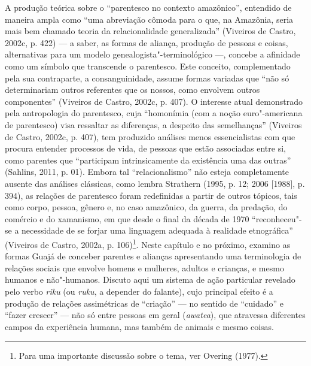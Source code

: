 A produção teórica sobre o ``parentesco no contexto amazônico'', entendido
de maneira ampla como ``uma abreviação cômoda para o que, na Amazônia,
seria mais bem chamado teoria da relacionalidade generalizada'' (Viveiros
de Castro, 2002c, p. 422) --- a saber, as formas de aliança, produção de
pessoas e coisas, alternativas para um modelo genealogista"-terminológico
---, concebe a afinidade como um símbolo que transcende o parentesco. Este
conceito, complementado pela sua contraparte, a consanguinidade, assume
formas variadas que ``não só determinariam outros referentes que os
nossos, como envolvem outros componentes'' (Viveiros de Castro,
2002c, p. 407). O interesse atual demonstrado pela antropologia do
parentesco, cuja ``homonímia (com a noção euro"-americana de parentesco)
visa ressaltar as diferenças, a despeito das semelhanças'' (Viveiros de
Castro, 2002c, p. 407), tem produzido análises menos essencialistas com que
procura entender processos de vida, de pessoas que estão associadas
entre si, como parentes que ``participam intrinsicamente da existência
uma das outras'' (Sahlins, 2011, p. 01). Embora tal ``relacionalismo'' não
esteja completamente ausente das análises clássicas, como lembra
Strathern (1995, p. 12; 2006 {[}1988{]}, p. 394), as relações de parentesco
foram redefinidas a partir de outros tópicos, tais como corpo, pessoa,
gênero e, no caso amazônico, da guerra, da predação, do comércio e do
xamanismo, em que desde o final da década de 1970 ``reconheceu"-se a
necessidade de se forjar uma linguagem adequada à realidade etnográfica''
(Viveiros de Castro, 2002a, p. 106)\footnote{Para uma importante discussão
  sobre o tema, ver Overing (1977).}. Neste capítulo e no próximo,
examino as formas Guajá de conceber parentes e alianças apresentando uma
terminologia de relações sociais que envolve homens e mulheres, adultos
e crianças, e mesmo humanos e não"-humanos. Discuto aqui um sistema de
ação particular revelado pelo verbo \emph{riku} (ou \emph{ruku}, a
depender do falante), cujo principal efeito é a produção de relações
assimétricas de ``criação'' --- no sentido de ``cuidado'' e ``fazer crescer'' ---
não só entre pessoas em geral (\emph{awatea}), que atravessa diferentes
campos da experiência humana, mas também de animais e mesmo coisas.

